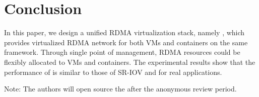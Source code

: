 \section{Conclusion} \label{conclusion}

In this paper, we design a unified RDMA virtualization stack, namely \sys, which provides virtualized RDMA network for both VMs and containers on the same framework.
Through single point of management, RDMA resources could be flexibly allocated to VMs and containers. %
The experimental results show that the performance of \sys is similar to those of SR-IOV and \native for real applications.

Note: The authors will open source the \sys after the anonymous review period.

